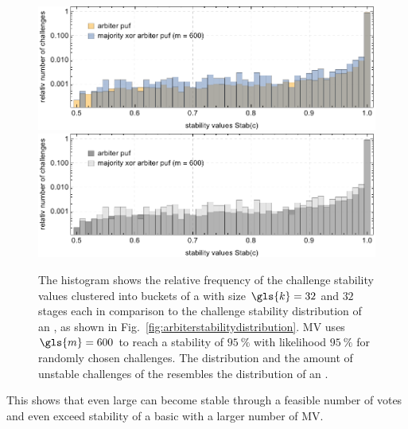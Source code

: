 \vspace{0.25cm}
\begin{figure}[ht]
\ifx{}\undefined
{}
\else
	\if{}
\centering
\includegraphics[width=1.00\textwidth]{images/comparison-arbiter-stability-distribution-majority-xor-stability-distribution.pdf}
	\else
\includegraphics[width=1.00\textwidth]{images/comparison-arbiter-stability-distribution-majority-xor-stability-distribution_mono.pdf}  
    \fi
\fi
\caption[Challenge stability distribution of a Majority \acs{XOR} \apuf]{The histogram shows the relative frequency of the challenge stability values clustered into buckets of a \mxpuf with size $\gls{k} = 32$ and $32$ stages each in comparison to the challenge stability distribution of an \apuf, as shown in Fig.\ \ref{fig:arbiterstabilitydistribution}. \ac{MV} uses $\gls{m} = 600$ to reach a stability of $95\ \%$ with likelihood $95\ \%$ for randomly chosen challenges. The distribution and the amount of unstable challenges of the \mxpuf resembles the distribution of an \apuf.} 
\label{fig:comparisonarbiterstabilitydistributionmajorityxorstabilitydistribution}
\end{figure}

This shows that even large \mxpufs can become stable through a feasible number of votes and even exceed stability of a basic \apuf with a larger number of \ac{MV}.












